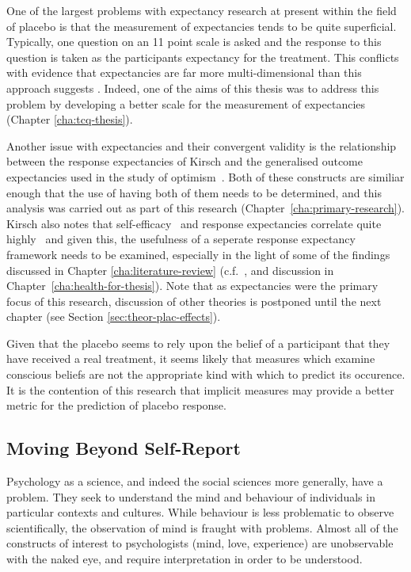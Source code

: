 One of the largest problems with expectancy research at present within the field of placebo is that the measurement of expectancies tends to be quite superficial. Typically, one question on an 11 point scale is asked and the response to this question is taken as the participants expectancy for the treatment. This conflicts with evidence that expectancies are far more multi-dimensional than this approach suggests \cite{Stone2005}. Indeed, one of the aims of this thesis was to address this problem by developing a better scale for the measurement of expectancies (Chapter \ref{cha:tcq-thesis}). 

Another issue with expectancies and their convergent validity is the relationship between the response expectancies of Kirsch  and the generalised outcome expectancies used in the study of optimism~\cite{Carver2010}. Both of these constructs are similiar enough that the use of having both of them needs to be determined, and this analysis was carried out as part of this research (Chapter~\ref{cha:primary-research}). Kirsch also notes that self-efficacy~\cite{Bandura1977} and response expectancies correlate quite highly~\cite{Kirsch1985} and given this, the usefulness of a seperate response expectancy framework needs to be examined, especially in the light of some of the findings discussed in Chapter \ref{cha:literature-review} (c.f.~\cite{Geers2005,Hyland2007}, and discussion in Chapter~\ref{cha:health-for-thesis}). Note that as expectancies were the primary focus of this research, discussion of other theories is postponed until the next chapter (see Section \ref{sec:theor-plac-effects}). 


Given that the placebo seems to rely upon the belief of a participant that they have received a real treatment, it seems likely that measures which examine conscious beliefs are not the appropriate kind with which to predict its occurence. It is the contention of this research that implicit measures may provide a better metric for the prediction of placebo response. 

\subsection{Moving Beyond Self-Report}
\label{sec:implicit-measures}

Psychology as a science, and indeed the social sciences more generally, have a problem. They seek to understand the mind and behaviour of individuals in particular contexts and cultures. While behaviour is less problematic to observe scientifically, the observation of mind is fraught with problems. Almost all of the constructs of interest to psychologists (mind, love, experience) are unobservable with the naked eye, and require interpretation in order to be understood. 

